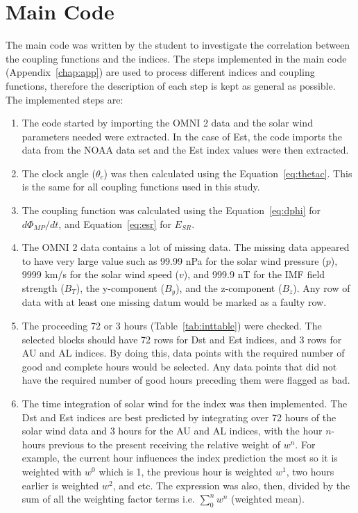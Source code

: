 \documentclass[12pt]{report} %
\begin{document}
\vspace{-10pt}
\section{Main Code} \label{sec:maincode}
\vspace{-10pt}
The main code was written by the student to investigate the correlation between the coupling functions and the indices. The steps implemented in the main code (Appendix~\ref{chap:app}) are used to process different indices and coupling functions, therefore the description of each step is kept as general as possible. The implemented steps are:
\begin{enumerate}
\item The code started by importing the OMNI 2 data and the solar wind parameters needed were extracted. In the case of Est, the code imports the data from the NOAA data set and the Est index values were then extracted.
\item The clock angle ($\theta_c$) was then calculated using the Equation~\ref{eq:thetac}. This is the same for all coupling functions used in this study.
\item The coupling function was calculated using the Equation~\ref{eq:dphi} for $d\Phi_{MP}/dt$, and Equation~\ref{eq:esr} for $E_{SR}$.
\item The OMNI 2 data contains a lot of missing data. The missing data appeared to have very large value such as 99.99 nPa for the solar wind pressure ($p$), 9999 km/s for the solar wind speed ($v$), and 999.9 nT for the IMF field strength ($B_T$), the y-component ($B_y$), and the z-component ($B_z$). Any row of data with at least one missing datum would be marked as a faulty row. 
\item The proceeding 72 or 3 hours (Table~\ref{tab:inttable}) were checked. The selected blocks should have 72 rows for Dst and Est indices, and 3 rows for AU and AL indices. By doing this, data points with the required number of good and complete hours would be selected. Any data points that did not have the required number of good hours preceding them were flagged as bad.
 
\item The time integration of solar wind for the index was then implemented.  The Dst and Est indices are best predicted by integrating over 72 hours of the solar wind data and 3 hours for the AU and AL indices, with the hour $n$-hours previous to the present receiving the relative weight of $w^n$. For example, the current hour influences the index prediction the most so it is weighted with $w^0$ which is 1, the previous hour is weighted $w^1$, two hours earlier is weighted $w^2$, and etc. 
 The expression was also, then, divided by the sum of all the weighting factor terms i.e. $\sum_{0}^n w^n$ (weighted mean). 
 

\end{enumerate}
\end{document}
